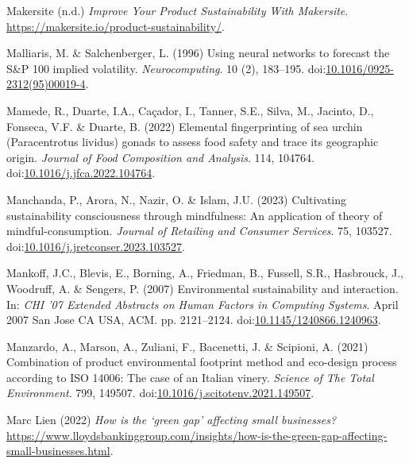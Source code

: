 \documentclass[
  letterpaper,
  DIV=11,
  numbers=noendperiod]{scrartcl}
\newlength{\cslhangindent}
\newenvironment{CSLReferences}[2] %
 {\begin{list}{}{%
  \setlength{\itemindent}{0pt}
  \setlength{\leftmargin}{0pt}
  \setlength{\parsep}{0pt}
  \ifodd #1
   \setlength{\leftmargin}{\cslhangindent}
   \setlength{\itemindent}{-1\cslhangindent}
  \fi
  \setlength{\itemsep}{#2\baselineskip}}}
 {\end{list}}
\begin{document}
\begin{CSLReferences}{0}{1}
Makersite (n.d.) \emph{Improve {Your Product Sustainability With
Makersite}}. \url{https://makersite.io/product-sustainability/}.

Malliaris, M. \& Salchenberger, L. (1996) Using neural networks to
forecast the {S}\&{P} 100 implied volatility. \emph{Neurocomputing}. 10
(2), 183--195.
doi:\href{https://doi.org/10.1016/0925-2312(95)00019-4}{10.1016/0925-2312(95)00019-4}.

Mamede, R., Duarte, I.A., Caçador, I., Tanner, S.E., Silva, M., Jacinto,
D., Fonseca, V.F. \& Duarte, B. (2022) Elemental fingerprinting of sea
urchin ({Paracentrotus} lividus) gonads to assess food safety and trace
its geographic origin. \emph{Journal of Food Composition and Analysis}.
114, 104764.
doi:\href{https://doi.org/10.1016/j.jfca.2022.104764}{10.1016/j.jfca.2022.104764}.

Manchanda, P., Arora, N., Nazir, O. \& Islam, J.U. (2023) Cultivating
sustainability consciousness through mindfulness: {An} application of
theory of mindful-consumption. \emph{Journal of Retailing and Consumer
Services}. 75, 103527.
doi:\href{https://doi.org/10.1016/j.jretconser.2023.103527}{10.1016/j.jretconser.2023.103527}.

Mankoff, J.C., Blevis, E., Borning, A., Friedman, B., Fussell, S.R.,
Hasbrouck, J., Woodruff, A. \& Sengers, P. (2007) Environmental
sustainability and interaction. In: \emph{{CHI} '07 {Extended Abstracts}
on {Human Factors} in {Computing Systems}}. April 2007 San Jose CA USA,
ACM. pp. 2121--2124.
doi:\href{https://doi.org/10.1145/1240866.1240963}{10.1145/1240866.1240963}.

Manzardo, A., Marson, A., Zuliani, F., Bacenetti, J. \& Scipioni, A.
(2021) Combination of product environmental footprint method and
eco-design process according to {ISO} 14006: {The} case of an {Italian}
vinery. \emph{Science of The Total Environment}. 799, 149507.
doi:\href{https://doi.org/10.1016/j.scitotenv.2021.149507}{10.1016/j.scitotenv.2021.149507}.

Marc Lien (2022) \emph{How is the {`green gap'} affecting small
businesses?}
\url{https://www.lloydsbankinggroup.com/insights/how-is-the-green-gap-affecting-small-businesses.html}.


\end{CSLReferences}
\end{document}

